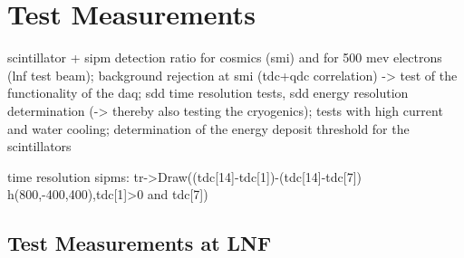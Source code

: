 \chapter{Test Measurements}
\label{chap:TestMeasurements}

scintillator + sipm detection ratio for cosmics (smi) and for 500 mev electrons (lnf test beam); background rejection at smi (tdc+qdc correlation) -> test of the functionality of the daq; sdd time resolution tests, sdd energy resolution determination (-> thereby also testing the cryogenics); tests with high current and water cooling; determination of the energy deposit threshold for the scintillators

time resolution sipms: tr->Draw((tdc[14]-tdc[1])-(tdc[14]-tdc[7]) h(800,-400,400),tdc[1]>0 and tdc[7])

\section{Test Measurements at LNF}

